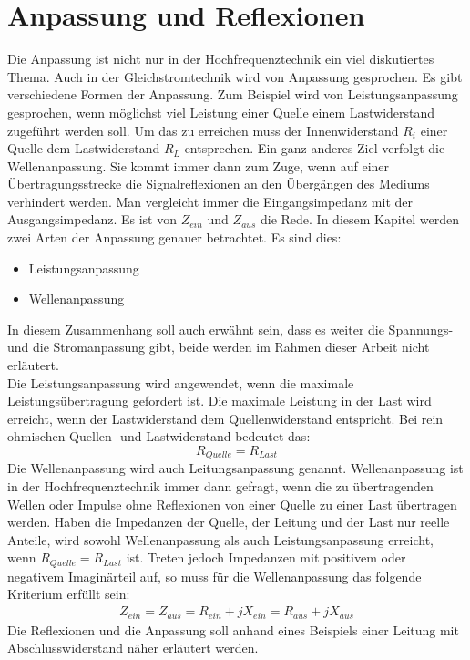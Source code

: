 \section{Anpassung und Reflexionen}\label{sec:AnpassungReflexionen}
Die Anpassung ist nicht nur in der Hochfrequenztechnik ein viel diskutiertes Thema. Auch in der Gleichstromtechnik wird von Anpassung gesprochen. Es gibt verschiedene Formen der Anpassung. Zum Beispiel wird von Leistungsanpassung gesprochen, wenn möglichst viel Leistung einer Quelle einem Lastwiderstand zugeführt werden soll. Um das zu erreichen muss der Innenwiderstand  $R_i$ einer Quelle dem Lastwiderstand $R_L$ entsprechen.  Ein ganz anderes Ziel verfolgt die Wellenanpassung. Sie kommt immer dann zum Zuge, wenn auf einer Übertragungsstrecke die Signalreflexionen an den Übergängen des Mediums verhindert werden.
Man vergleicht immer die Eingangsimpedanz mit der Ausgangsimpedanz. Es ist  von $Z_{ein}$ und $Z_{aus}$ die Rede.
In diesem Kapitel werden zwei Arten der Anpassung genauer betrachtet. Es sind dies:
\begin{itemize}
\item Leistungsanpassung
\item Wellenanpassung
\end{itemize}
In diesem Zusammenhang soll auch erwähnt sein, dass es weiter die Spannungs- und die Stromanpassung gibt, beide werden im Rahmen dieser Arbeit nicht erläutert. \\
Die Leistungsanpassung wird angewendet, wenn die maximale Leistungsübertragung gefordert ist. Die maximale Leistung in der Last wird erreicht, wenn der Lastwiderstand dem Quellenwiderstand entspricht. Bei rein ohmischen Quellen- und Lastwiderstand bedeutet das:\\
\[R_{Quelle} = R_{Last}\]
Die Wellenanpassung wird auch Leitungsanpassung  genannt. Wellenanpassung ist in der Hochfrequenztechnik immer dann gefragt, wenn die zu übertragenden Wellen oder Impulse ohne Reflexionen von einer Quelle zu einer Last übertragen werden. Haben die Impedanzen der Quelle, der Leitung und der Last nur reelle Anteile, wird sowohl Wellenanpassung als auch Leistungsanpassung erreicht, wenn $R_{Quelle} = R_{Last}$ ist. Treten jedoch Impedanzen mit positivem oder negativem Imaginärteil auf, so muss für die Wellenanpassung das folgende Kriterium erfüllt sein:
\begin{eqnarray}\label{eq:ZeinZaus}
Z_{ein} = Z_{aus} = R_{ein} +jX_{ein} = R_{aus} + jX_{aus}
\end{eqnarray}
Die Reflexionen und die Anpassung soll anhand eines Beispiels einer Leitung mit Abschlusswiderstand  näher erläutert werden. \\


